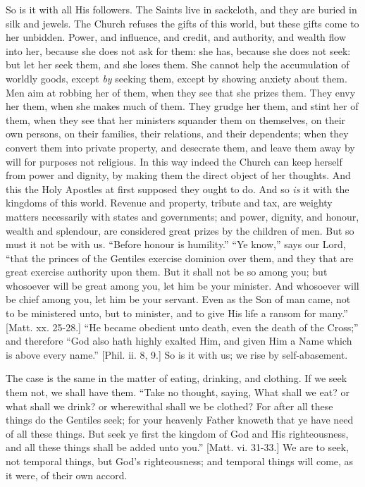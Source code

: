 So is it with all His followers. The Saints live in sackcloth, and
they are buried in silk and jewels. The Church refuses the gifts of
this world, but these gifts come to her unbidden. Power, and
influence, and credit, and authority, and wealth flow into her,
because she does not ask for them: she has, because she does not seek:
but let her seek them, and she loses them. She cannot help the
accumulation of worldly goods, except \emph{by} seeking them, except
by showing anxiety about them. Men aim at robbing her of them, when
they see that she prizes them. They envy her them, when she makes much
of them. They grudge her them, and stint her of them, when they see
that her ministers squander them on themselves, on their own persons,
on their families, their relations, and their dependents; when they
convert them into private property, and desecrate them, and leave them
away by will for purposes not religious. In this way indeed the Church
can keep herself from power and dignity, by making them the direct
object of her thoughts. And this the Holy Apostles at first supposed
they ought to do. And so \emph{is} it with the kingdoms of this world.
Revenue and property, tribute and tax, are weighty matters necessarily
with states and governments; and power, dignity, and honour, wealth
and splendour, are considered great prizes by the children of men. But
so must it not be with us. ``Before honour is humility.''
``Ye know,'' says our Lord, ``that the princes of the
Gentiles exercise dominion over them, and they that are great exercise
authority upon them. But it shall not be so among you; but whosoever
will be great among you, let him be your minister. And whosoever will
be chief among you, let him be your servant. Even as the Son of man
came, not to be ministered unto, but to minister, and to give His life
a ransom for many.'' [Matt. xx. 25-28.] ``He became obedient
unto death, even the death of the Cross;'' and therefore ``God
also hath highly exalted Him, and given Him a Name which is above
every name.'' [Phil. ii. 8, 9.] So is it with us; we rise by
self-abasement.

The case is the same in the matter of eating, drinking, and
clothing. If we seek them not, we shall have them. ``Take no
thought, saying, What shall we eat? or what shall we drink? or
wherewithal shall we be clothed? For after all these things do the
Gentiles seek; for your heavenly Father knoweth that ye have need of
all these things. But seek ye first the kingdom of God and His
righteousness, and all these things shall be added unto you.''
[Matt. vi. 31-33.] We are to seek, not temporal things, but God's
righteousness; and temporal things will come, as it were, of their own
accord.

